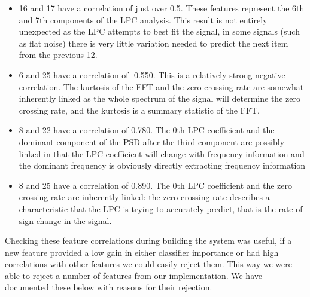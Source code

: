 \documentclass[ %
                    author={Sam Phippen},
                supervisor={Dr. Rafal Bogacz},
                     title={Real time voice activity detectors in noisy personal computing environments},
                  subtitle={},
                    degree={MEng},
                      year={2012} ]{thesis}
\begin{document}
\begin{itemize}

    \item 16 and 17 have a correlation of just over 0.5. These features
        represent the 6th and 7th components of the LPC analysis. This result
        is not entirely unexpected as the LPC attempts to best fit the signal,
        in some signals (such as flat noise) there is very little variation
        needed to predict the next item from the previous 12.

    \item 6 and 25 have a correlation of -0.550. This is a relatively strong
        negative correlation. The kurtosis of the FFT and the zero crossing
        rate are somewhat inherently linked as the whole spectrum of the signal
        will determine the zero crossing rate, and the kurtosis is a summary
        statistic of the FFT.

    \item 8 and 22 have a correlation of 0.780. The 0th LPC coefficient and the
        dominant component of the PSD after the third component are possibly
        linked in that the LPC coefficient will change with frequency
        information and the dominant frequency is obviously directly extracting
        frequency information

    \item 8 and 25 have a correlation of 0.890. The 0th LPC coefficient and the
        zero crossing rate are inherently linked: the zero crossing rate describes
        a characteristic that the LPC is trying to accurately predict, that is the
        rate of sign change in the signal.
\end{itemize}

Checking these feature correlations during building the system was useful, if a
new feature provided a low gain in either classifier importance or had high correlations
with other features we could easily reject them. This way we were able to reject
a number of features from our implementation. We have documented these below with
reasons for their rejection.
\end{document}
